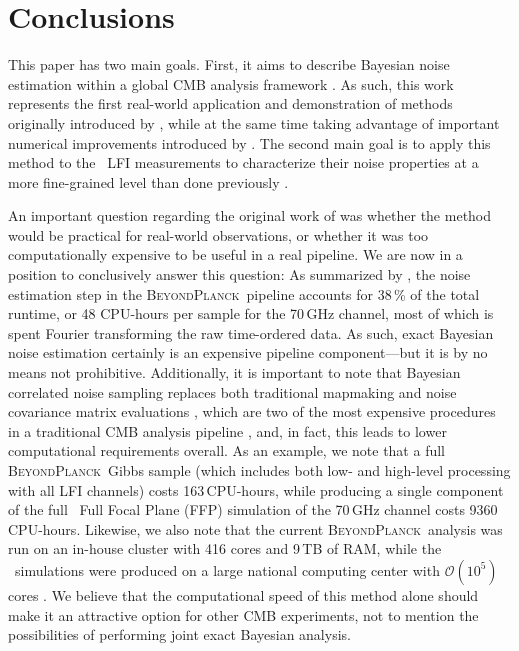 \documentclass[twocolumn]{aa}
\newcommand{\BP}{\textsc{BeyondPlanck}}
\begin{document}
\section{Conclusions}
\label{sec:conclusions}

This paper has two main goals. First, it aims to describe Bayesian
noise estimation within a global CMB analysis framework
\citep{bp01}. As such, this work represents the first real-world
application and demonstration of methods originally introduced by
\citet{wehus:2012}, while at the same time taking advantage of
important numerical improvements introduced by \citet{bp02}. The
second main goal is to apply this method to the \Planck\ LFI
measurements to characterize their noise properties at a more
fine-grained level than done previously \citep{planck2016-l02}.

An important question regarding the original work of
\citet{wehus:2012} was whether the method would be practical for
real-world observations, or whether it was too computationally
expensive to be useful in a real pipeline. We are now in a position to
conclusively answer this question: As summarized by \citep{bp01,bp05},
the noise estimation step in the \BP\ pipeline accounts for 38\,\% of
the total runtime, or 48 CPU-hours per sample for the 70\,GHz channel,
most of which is spent Fourier transforming the raw time-ordered
data. As such, exact Bayesian noise estimation certainly is an
expensive pipeline component---but it is by no means not
prohibitive. Additionally, it is important to note that Bayesian
correlated noise sampling replaces both traditional mapmaking and
noise covariance matrix evaluations \citep{bp02,bp13}, which are two
of the most expensive procedures in a traditional CMB analysis
pipeline \citep{planck2016-l01}, and, in fact, this leads to lower
computational requirements overall. As an example, we note that a full
\BP\ Gibbs sample (which includes both low- and high-level processing
with all LFI channels) costs 163\,CPU-hours, while producing a single
component of the full \Planck\ Full Focal Plane (FFP) simulation of
the 70\,GHz channel costs 9360\,CPU-hours. Likewise, we also note that
the current \BP\ analysis was run on an in-house cluster with 416
cores and 9\,TB of RAM, while the \Planck\ simulations were produced
on a large national computing center with $\mathcal{O}(10^5)$ cores
\citep{planck2016-l01,planck2020-LVII}. We believe that the computational speed
of this method alone should make it an attractive option for other CMB
experiments, not to mention the possibilities of performing joint
exact Bayesian analysis.
\end{document}
